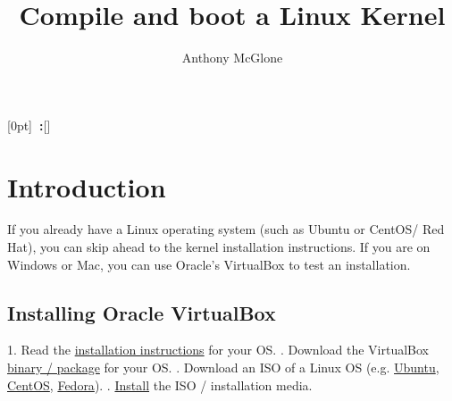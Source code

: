 \documentclass[12pt,a4paper]{report}
\author{Anthony McGlone}\title{Compile and boot a Linux Kernel}
\newcommand{\setupname}[1][\chaptername]{
\titlecontents{chapter}[0pt]{\vspace{1ex}}{\bfseries#1~\thecontentslabel:\quad}{\bfseries}{\bfseries\hfill\contentspage}[]
}
\begin{document}
\maketitle

\tableofcontents

\setupname
\chapter{Introduction}

If you already have a Linux operating system (such as Ubuntu or CentOS/ Red Hat), you can skip ahead to the kernel installation instructions. 
\newline
\newline
If you are on Windows or Mac, you can use Oracle's VirtualBox to test an installation.

\section{Installing Oracle VirtualBox}

1. Read the \href{https://www.virtualbox.org/manual/ch02.html}{installation instructions} for your OS.
. Download the VirtualBox \href{https://www.virtualbox.org/wiki/Downloads}{binary / package} for your OS.
. Download an ISO of a Linux OS (e.g. \href{https://ubuntu.com/download/desktop}{Ubuntu}, \href{https://www.centos.org/download/}{CentOS}, \href{https://getfedora.org/workstation/download/}{Fedora}).
. \href{https://docs.oracle.com/cd/E26217_01/E26796/html/qs-create-vm.html}{Install} the ISO / installation media.
\end{document}
